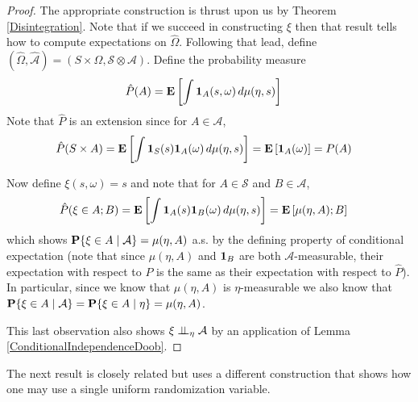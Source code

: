 \begin{proof}
The appropriate construction is thrust upon us by Theorem
\ref{Disintegration}.  Note that if we succeed in constructing $\xi$
then that result tells how to compute expectations on $\hat{\Omega}$.
Following that lead, define
$(\hat{\Omega}, \hat{\mathcal{A}}) = (S \times \Omega,
\mathcal{S} \otimes \mathcal{A})$.  Define the probability measure 
\begin{align*}
\hat{P}(A) &= \textbf{E}\left[\int \textbf{1}_{A}(s,\omega) \,
  d\mu(\eta, s)\right]
\end{align*}
Note that $\hat{P}$ is an extension since for $A \in \mathcal{A}$, 
\begin{align*}
\hat{P}(S \times A) &= \textbf{E}\left[\int \textbf{1}_{S}(s)\textbf{1}_{A}(\omega) \,
  d\mu(\eta, s)\right] = \textbf{E}\left[\textbf{1}_{A}(\omega)\right] = P(A)
\end{align*}

Now define $\xi(s, \omega) = s$ and note that for $A \in \mathcal{S}$
and $B \in \mathcal{A}$, 
\begin{align*}
\hat{P}(\xi \in A ; B) &=  \textbf{E}\left[\int \textbf{1}_{A}(s)\textbf{1}_{B}(\omega) \,
  d\mu(\eta, s)\right] = \textbf{E}\left[\mu(\eta, A) ; B\right]
\end{align*}
which shows $\textbf{P}\{\xi \in A \mid \mathcal{A}\}= \mu(\eta, A)$ a.s. 
by the defining property of conditional expectation (note that since
$\mu(\eta, A)$ and $\textbf{1}_{B}$ are both
$\mathcal{A}$-measurable, their expectation with respect to $P$ is the
same as their expectation with respect to $\hat{P}$).  In particular,
since we know that $\mu(\eta, A)$ is $\eta$-measurable we also know
that $\textbf{P}\{\xi \in A \mid \mathcal{A}\}=\textbf{P}\{\xi \in A \mid \eta\} = \mu(\eta, A)$.

This last observation also shows $\xi \perp \! \! \! \perp_{\eta} \mathcal{A}$ by an application of Lemma \ref{ConditionalIndependenceDoob}.
\end{proof}

The next result is closely related but uses a different construction
that shows how one may use a single uniform randomization variable.

